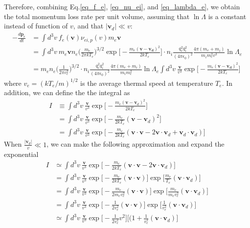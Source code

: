 \documentclass{article}
\begin{document}
Therefore, combining Eq.\ref{eq_f_e}, \ref{eq_nu_ei}, and \ref{eq_lambda_e}, we obtain the total momentum loss rate per unit volume, assuming that $\ln \Lambda$ is a constant instead of function of $v$, and that $|\bm{v}_d| \ll v$:
\begin{equation}
	\begin{split}
		-\frac{d \bm{p}_e}{d t} &= \int d^3v\ f_e(\bm{v}) \nu_{ei,p} (v) m_e \bm{v}\\
		&= \int d^3v\ m_e\bm{v} n_e \Big(\frac{m_e}{2\pi kT_e} \Big)^{3/2} \exp\Big[-\frac{m_e(\bm{v} - \bm{v_d})^2}{2kT_e} \Big] \cdot n_i\frac{q_e^2 q_i^2}{(4\pi \epsilon_0 )^2}\frac{4\pi(m_e+m_i)}{m_i m_e^2 v^3} \ln \Lambda_e \\
		&= m_e n_e \Big(\frac{1}{2\pi v_e^2} \Big)^{3/2} \cdot n_i\frac{q_e^2 q_i^2}{(4\pi \epsilon_0 )^2}\frac{4\pi(m_e+m_i)}{m_i m_e^2} \ln \Lambda_e \int d^3v\ \frac{\bm{v}}{v^3} \exp\Big[-\frac{m_e(\bm{v} - \bm{v_d})^2}{2kT_e} \Big] 
	\end{split}
\end{equation}
where $v_e = (kT_e/m )^{1/2}$ is the average thermal speed at temperature $T_e$. In addition, we can define the the integral as
\begin{equation}
	\begin{split}
		I &\equiv \int d^3v\ \frac{\bm{v}}{v^3} \exp\Big[-\frac{m_e(\bm{v} - \bm{v}_d)^2}{2kT_e} \Big] \\
		&= \int d^3v\ \frac{\bm{v}}{v^3} \exp\Big[-\frac{m_e}{2kT_e}(\bm{v} - \bm{v}_d)^2 \Big]\\
		&= \int d^3v\ \frac{\bm{v}}{v^3} \exp\Big[-\frac{m_e}{2kT_e}(\bm{v}\cdot\bm{v} - 2\bm{v}\cdot\bm{v}_d + \bm{v}_d\cdot\bm{v}_d) \Big]
	\end{split} 
\end{equation}
When $\frac{|\bm{v}_d|}{v} \ll 1$, we can make the following approximation and expand the exponential
\begin{equation}
	\begin{split}
		I &\simeq \int d^3v\ \frac{\bm{v}}{v^3} \exp\Big[-\frac{m_e}{2kT_e}(\bm{v}\cdot\bm{v} - 2\bm{v}\cdot\bm{v}_d) \Big] \\
		&= \int d^3v\ \frac{\bm{v}}{v^3} \exp\Big[-\frac{m_e}{2kT_e}(\bm{v}\cdot\bm{v}) \Big] \exp\Big[\frac{m_e}{T_e}(\bm{v}\cdot\bm{v}_d ) \Big]\\
		&= \int d^3v\ \frac{\bm{v}}{v^3} \exp\Big[-\frac{m_e}{2m_ev_e^2}(\bm{v}\cdot\bm{v}) \Big] \exp\Big[\frac{m_e}{m_e v_e^2}(\bm{v}\cdot\bm{v}_d ) \Big] \\
		&= \int d^3v\ \frac{\bm{v}}{v^3} \exp\Big[-\frac{1}{2v_e^2}(\bm{v}\cdot\bm{v}) \Big] \exp\Big[\frac{1}{v_e^2}(\bm{v}\cdot\bm{v}_d ) \Big] \\
		&\simeq \int d^3v\ \frac{\bm{v}}{v^3} \exp\Big[-\frac{1}{2v_e^2}v^2 \Big] \Big[(1 + \frac{1}{v_e^2}(\bm{v}\cdot\bm{v}_d ) \Big]
 	\end{split}
\end{equation}
\end{document}
